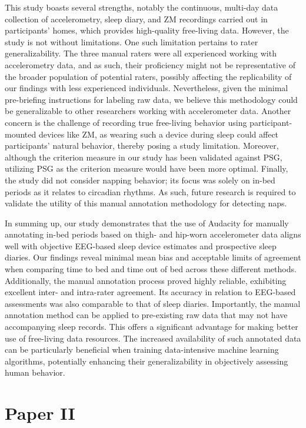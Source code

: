 \documentclass[
  10pt,
]{scrbook}
\begin{document}
This study boasts several strengths, notably the continuous, multi-day
data collection of accelerometry, sleep diary, and ZM recordings carried
out in participants' homes, which provides high-quality free-living
data. However, the study is not without limitations. One such limitation
pertains to rater generalizability. The three manual raters were all
experienced working with accelerometry data, and as such, their
proficiency might not be representative of the broader population of
potential raters, possibly affecting the replicability of our findings
with less experienced individuals. Nevertheless, given the minimal
pre-briefing instructions for labeling raw data, we believe this
methodology could be generalizable to other researchers working with
accelerometer data. Another concern is the challenge of recording true
free-living behavior using participant-mounted devices like ZM, as
wearing such a device during sleep could affect participants' natural
behavior, thereby posing a study limitation. Moreover, although the
criterion measure in our study has been validated against PSG, utilizing
PSG as the criterion measure would have been more optimal. Finally, the
study did not consider napping behavior; its focus was solely on in-bed
periods as it relates to circadian rhythms. As such, future research is
required to validate the utility of this manual annotation methodology
for detecting naps.

In summing up, our study demonstrates that the use of Audacity for
manually annotating in-bed periods based on thigh- and hip-worn
accelerometer data aligns well with objective EEG-based sleep device
estimates and prospective sleep diaries. Our findings reveal minimal
mean bias and acceptable limits of agreement when comparing time to bed
and time out of bed across these different methods. Additionally, the
manual annotation process proved highly reliable, exhibiting excellent
inter- and intra-rater agreement. Its accuracy in relation to EEG-based
assessments was also comparable to that of sleep diaries. Importantly,
the manual annotation method can be applied to pre-existing raw data
that may not have accompanying sleep records. This offers a significant
advantage for making better use of free-living data resources. The
increased availability of such annotated data can be particularly
beneficial when training data-intensive machine learning algorithms,
potentially enhancing their generalizability in objectively assessing
human behavior.

\hypertarget{paper-ii}{%
\section{Paper II}\label{paper-ii}}
\end{document}
